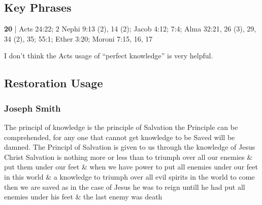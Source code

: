\subsection{Key Phrases} %
	\label{KNOWLEDGE-PHRASES}

	\begin{compactdesc}
		\item[perfect knowledge] \textbf{20} | Acts 24:22; 2 Nephi 9:13 (2), 14 (2); Jacob 4:12; 7:4; Alma 32:21, 26 (3), 29, 34 (2), 35; 55:1; Ether 3:20; Moroni 7:15, 16, 17
			\begin{compactdesc}
				\item[Bible anchor verses] \phantom{.}
					\begin{compactdesc}
						\item[{\hyperref[ACTS-24-22]{Acts 24:22}}] 
					\end{compactdesc}
				\item[Commentary] I don't think the Acts usage of ``perfect knowledge'' is very helpful.
			\end{compactdesc}
	\end{compactdesc}
	

\subsection{Restoration Usage} %
	\label{KNOWLEDGE-RESTORATION}

	\subsubsection{Joseph Smith} %
		\label{KNOWLEDGE-JS}
	
		\begin{compactdesc}
			\item[{\hyperlink{EMS-1843-JS-14-MAY-1843-A-WW-a}{14 May 1843 WW-a}}] The principl of knowledge is the principle of Salvation the Principle can be comprehended, for any one that cannot get knowledge to be Saved will be damned. The Principl of Salvation is given to us through the knowledge of Jesus Christ Salvation is nothing more or less than to triumph over all our enemies \& put them under our feet \& when we have power to put all enemies under our feet in this world \& a knowledge to triumph over all evil spirits in the world to come then we are saved as in the case of Jesus he was to reign untill he had put all enemies under his feet \& the last enemy was death
		\end{compactdesc}
	
